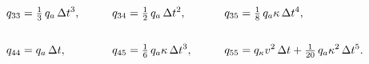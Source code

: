 \begin{equation}
    \setlength{\jot}{10pt}
    \begin{aligned}
        q_{33} &= \tfrac{1}{3}\,q_a\,\Delta t^3, &
        \qquad q_{34} &= \tfrac{1}{2}\,q_a\,\Delta t^2, &
        \qquad q_{35} &= \tfrac{1}{8}\,q_a \kappa\,\Delta t^4, \\[10pt]
        q_{44} &= q_a\,\Delta t, &
        \qquad q_{45} &= \tfrac{1}{6}\,q_a \kappa\,\Delta t^3, &
        \qquad q_{55} &= q_\kappa v^2\,\Delta t + \tfrac{1}{20}\,q_a \kappa^2\,\Delta t^5.
    \end{aligned}
\end{equation}
